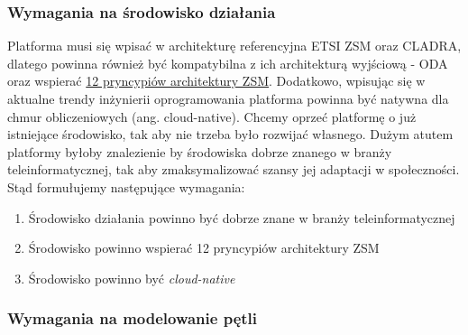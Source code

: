 \subsubsection{Wymagania na środowisko działania}

Platforma musi się wpisać w architekturę referencyjna ETSI ZSM oraz CLADRA, dlatego powinna również być kompatybilna z ich architekturą wyjściową - ODA \cite{tmforum2018} oraz wspierać \hyperlink{sec:zsm}{12 pryncypiów architektury ZSM}. Dodatkowo, wpisując się w aktualne trendy inżynierii oprogramowania platforma powinna być natywna dla chmur obliczeniowych (ang. cloud-native). Chcemy oprzeć platformę o już istniejące środowisko, tak aby nie trzeba było rozwijać własnego. Dużym atutem platformy byłoby znalezienie by środowiska dobrze znanego w branży teleinformatycznej, tak aby zmaksymalizować szansy jej adaptacji w społeczności.  Stąd formułujemy następujące wymagania:

\begin{enumerate}
    \setcounter{enumi}{0} 
    \item \label{req:1} Środowisko działania powinno być dobrze znane w branży teleinformatycznej
    \item \label{req:2} Środowisko powinno wspierać 12 pryncypiów architektury ZSM
    \item \label{req:3} Środowisko powinno być \textit{cloud-native}
\end{enumerate}

\subsubsection{Wymagania na modelowanie pętli}


